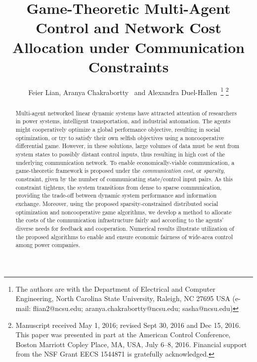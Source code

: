 \documentclass[12pt, draftclsnofoot,onecolumn]{IEEEtran}
\begin{document}
\title{Game-Theoretic Multi-Agent Control and Network Cost Allocation under Communication Constraints}
\author{Feier Lian, Aranya Chakrabortty~ and Alexandra Duel-Hallen~\thanks{The authors are with the Department of Electrical and Computer Engineering, North Carolina State University, Raleigh, NC 27695 USA (e-mail: flian2@ncsu.edu; aranya.chakrabortty@ncsu.edu; sasha@ncsu.edu)} \thanks{Manuscript received May 1, 2016; revised Sept 30, 2016 and Dec 15, 2016. This paper was presented in part at the American Control Conference, Boston Marriott Copley Place, MA, USA, July 6--8, 2016. Financial support from the NSF Grant EECS 1544871 is gratefully acknowledged.}}



















\maketitle
\vspace{-10ex}
\begin{abstract}
Multi-agent networked linear dynamic systems have attracted attention of researchers in power systems, intelligent transportation, and industrial automation. The agents might cooperatively optimize a global performance objective, resulting in social optimization, or try to satisfy their own selfish objectives using a noncooperative differential game. However, in these solutions, large volumes of data must be sent from system states to possibly distant control inputs, thus resulting in high cost of the underlying communication network. To enable economically-viable communication, a game-theoretic framework is proposed under the \textit{communication cost}, or \textit{sparsity}, constraint, given by the number of communicating state/control input pairs. As this constraint tightens, the system transitions from dense to sparse communication, providing the trade-off between dynamic system performance and information exchange. Moreover, using the proposed sparsity-constrained distributed social optimization and noncooperative game algorithms, we develop a method to allocate the costs of the communication infrastructure fairly and according to the agents' diverse needs for feedback and cooperation. Numerical results illustrate utilization of the proposed algorithms to enable and ensure economic fairness of wide-area control among power companies. 
\end{abstract}
\end{document}
